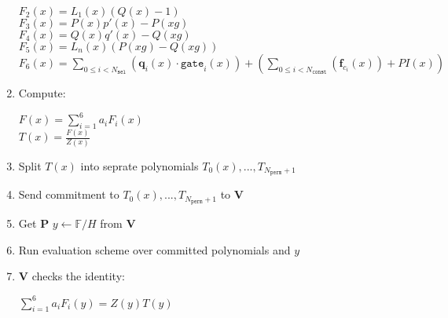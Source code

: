 \begin{enumerate}
\begin{center}
		$F_2(x) = L_1(x)(Q(x) - 1)$ \\
		$F_3(x) = P(x)p'(x) - P(xg)$ \\
		$F_4(x) = Q(x)q'(x) - Q(xg)$ \\
		$F_5(x) = L_n(x)(P(xg) - Q(xg))$ \\
		$F_6(x) = \sum\limits_{0 \leq i < N_{\texttt{sel}}} (\textbf{q}_{i}(x) \cdot \texttt{gate}_i(x))
			+ (\sum\limits_{0 \leq i < N_{\texttt{const}}}(\textbf{f}_{c_i}(x)) + PI(x))$
	\end{center}
	\item Compute:
	\begin{center}
		$F(x) = \sum\limits_{i = 1}^6 a_iF_i(x)$ \\
		$T(x) = \frac{F(x)}{Z(x)}$
	\end{center}
	\item Split $T(x)$ into seprate polynomials $T_0(x), ..., T_{N_{\texttt{perm}} + 1}$
	\item Send commitment to $T_0(x), ..., T_{N_{\texttt{perm}} + 1}$ to \textbf{V}
	\item Get \textbf{P} $y \leftarrow \mathbb{F}/H$ from \textbf{V}
	\item Run evaluation scheme over committed polynomials and $y$
	\item \textbf{V} checks the identity:
		\begin{center}
			$\sum\limits_{i = 1}^6a_iF_i(y) = Z(y)T(y)$
		\end{center}
\end{enumerate}
